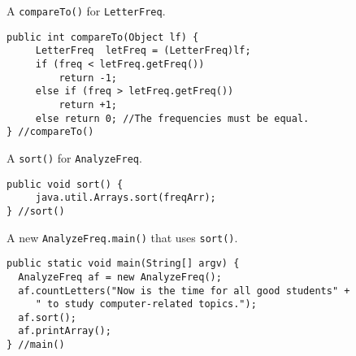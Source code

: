 \begin{ANS}
\item A {\tt compareTo()} for {\tt LetterFreq}.

\begin{jjjlisting}
\begin{lstlisting}
public int compareTo(Object lf) {
     LetterFreq  letFreq = (LetterFreq)lf;
     if (freq < letFreq.getFreq())
         return -1;
     else if (freq > letFreq.getFreq())
         return +1;
     else return 0; //The frequencies must be equal.
} //compareTo()
\end{lstlisting}
\end{jjjlisting}

\item A {\tt sort()} for {\tt AnalyzeFreq}.

\begin{jjjlisting}
\begin{lstlisting}
public void sort() {
     java.util.Arrays.sort(freqArr);
} //sort()
\end{lstlisting}
\end{jjjlisting}

\item A new {\tt AnalyzeFreq.main()} that uses {\tt sort()}.

\begin{jjjlisting}
\begin{lstlisting}
public static void main(String[] argv) {
  AnalyzeFreq af = new AnalyzeFreq();
  af.countLetters("Now is the time for all good students" +
     " to study computer-related topics.");
  af.sort();
  af.printArray();
} //main()
\end{lstlisting}
\end{jjjlisting}

\end{ANS}


